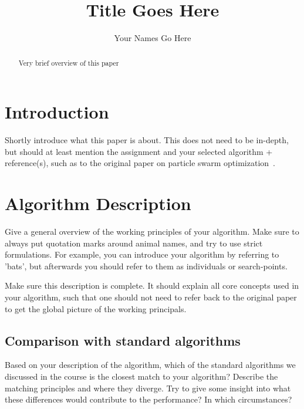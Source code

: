 \documentclass[runningheads]{llncs}
\begin{document}
%
\title{Title Goes Here}
%
%
\author{Your Names Go Here}
%
%
%
\maketitle              %
%
\begin{abstract}
Very brief overview of this paper
\end{abstract}


 


\section{Introduction}
Shortly introduce what this paper is about. This does not need to be in-depth, but should at least mention the assignment and your selected algorithm + reference(s), such as to the original paper on particle swarm optimization~\cite{eberhart1995particle}.

\section{Algorithm Description} \label{sec:description}
Give a general overview of the working principles of your algorithm. Make sure to always put quotation marks around animal names, and try to use strict formulations. For example, you can introduce your algorithm by referring to 'bats', but afterwards you should refer to them as individuals or search-points. 

Make sure this description is complete. It should explain all core concepts used in your algorithm, such that one should not need to refer back to the original paper to get the global picture of the working principals.

\subsection{Comparison with standard algorithms}
Based on your description of the algorithm, which of the standard algorithms we discussed in the course is the closest match to your algorithm? Describe the matching principles and where they diverge. Try to give some insight into what these differences would contribute to the performance? In which circumstances?
\end{document}
